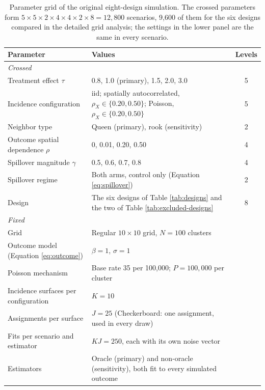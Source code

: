 \documentclass[11pt]{article}
\begin{document}
\begin{table}[!htb]

\small
\centering

\caption{Parameter grid of the original eight-design simulation. The crossed parameters form $5 \times 5 \times 2 \times 4 \times 4 \times 2 \times 8 = 12{,}800$ scenarios, 9,600 of them for the six designs compared in the detailed grid analysis; the settings in the lower panel are the same in every scenario.}
\label{tab:parameter-grid}

\begin{tabular}{p{5.8cm}p{7.6cm}c}

\toprule
Parameter & Values & Levels \\

\midrule
\multicolumn{3}{l}{\textit{Crossed}} \\
Treatment effect $\tau$ & 0.8, 1.0 (primary), 1.5, 2.0, 3.0 & 5 \\
Incidence configuration & iid; spatially autocorrelated, $\rho_X \in \{0.20, 0.50\}$; Poisson, $\rho_X \in \{0.20, 0.50\}$ & 5 \\
Neighbor type & Queen (primary), rook (sensitivity) & 2 \\
Outcome spatial dependence $\rho$ & 0, 0.01, 0.20, 0.50 & 4 \\
Spillover magnitude $\gamma$ & 0.5, 0.6, 0.7, 0.8 & 4 \\
Spillover regime & Both arms, control only (Equation \ref{eq:spillover}) & 2 \\
Design & The six designs of Table \ref{tab:designs} and the two of Table \ref{tab:excluded-designs} & 8 \\

\midrule
\multicolumn{3}{l}{\textit{Fixed}} \\
Grid & Regular $10\times10$ grid, $N = 100$ clusters & \\
Outcome model (Equation \ref{eq:outcome}) & $\beta = 1$, $\sigma = 1$ & \\
Poisson mechanism & Base rate 35 per 100,000; $P = 100{,}000$ per cluster & \\
Incidence surfaces per configuration & $K = 10$ & \\
Assignments per surface & $J = 25$ (Checkerboard: one assignment, used in every draw) & \\
Fits per scenario and estimator & $KJ = 250$, each with its own noise vector & \\
Estimators & Oracle (primary) and non-oracle (sensitivity), both fit to every simulated outcome & \\

\bottomrule

\end{tabular}

\end{table}
\end{document}
